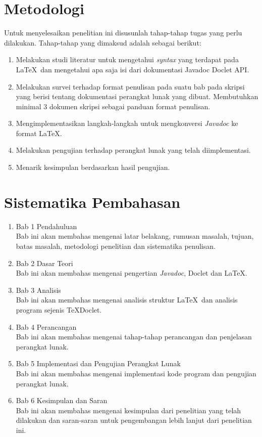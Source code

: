 \section{Metodologi}
\label{sec:metlit}
Untuk menyelesaikan penelitian ini disusunlah tahap-tahap tugas yang perlu dilakukan. Tahap-tahap yang dimaksud adalah sebagai berikut:
\begin{enumerate}
	\item Melakukan studi literatur untuk mengetahui {\it syntax} yang terdapat pada \LaTeX\ dan mengetahui apa saja isi dari dokumentasi Javadoc Doclet API.
	\item Melakukan survei terhadap format penulisan pada suatu bab pada skripsi yang berisi tentang dokumentasi perangkat lunak yang dibuat. Membutuhkan minimal 3 dokumen skripsi sebagai panduan format penulisan.
	\item Mengimplementasikan langkah-langkah untuk mengkonversi {\it Javadoc} ke format \LaTeX.
	\item Melakukan pengujian terhadap perangkat lunak yang telah diimplementasi.
	\item Menarik kesimpulan berdasarkan hasil pengujian.
\end{enumerate}

\section{Sistematika Pembahasan}
\label{sec:sispem}
\begin{enumerate}
	\item Bab 1 Pendahuluan\\
	Bab ini akan membahas mengenai latar belakang, rumusan masalah, tujuan, batas masalah, metodologi penelitian dan sistematika penulisan.
	\item Bab 2 Dasar Teori\\
	Bab ini akan membahas mengenai pengertian {\it Javadoc}, Doclet dan \LaTeX.
	\item Bab 3 Analisis\\
	Bab ini akan membahas mengenai analisis struktur \LaTeX\ dan analisis program sejenis TeXDoclet.
	\item Bab 4 Perancangan\\
	Bab ini akan membahas mengenai tahap-tahap perancangan dan penjelasan perangkat lunak.
	\item Bab 5 Implementasi dan Pengujian Perangkat Lunak\\
	Bab ini akan membahas mengenai implementasi kode program dan pengujian perangkat lunak.
	\item Bab 6 Kesimpulan dan Saran\\
	Bab ini akan membahas mengenai kesimpulan dari penelitian yang telah dilakukan dan saran-saran untuk pengembangan lebih lanjut dari penelitian ini.
\end{enumerate}
















